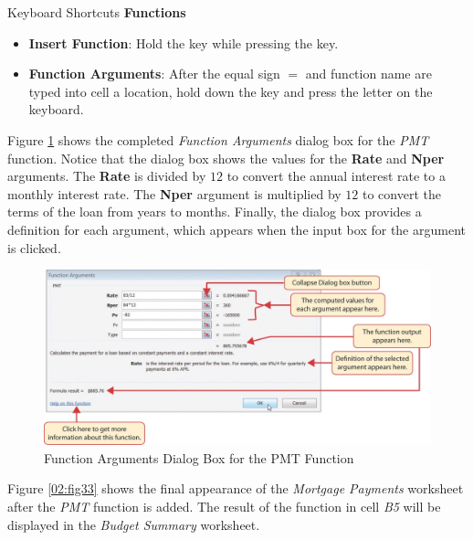 \begin{center}
	\begin{shtcutbox}{Keyboard Shortcuts}
		\textbf{Functions}
		\\
		\begin{itemize}
			\setlength{\itemsep}{0pt}
			\setlength{\parskip}{0pt}
			\setlength{\parsep}{0pt}
			
			\item \textbf{Insert Function}: Hold the  key while pressing the  key.
			\item \textbf{Function Arguments}: After the equal sign $ = $ and function name are typed into cell a location, hold down the  key and press the letter  on the keyboard.		
		\end{itemize}
	
	\end{shtcutbox}
\end{center}

Figure \ref{02:fig32} shows the completed \textit{Function Arguments} dialog box for the \textit{PMT} function. Notice that the dialog box shows the values for the \textbf{Rate} and \textbf{Nper} arguments. The \textbf{Rate} is divided by $ 12 $ to convert the annual interest rate to a monthly interest rate. The \textbf{Nper} argument is multiplied by $ 12 $ to convert the terms of the loan from years to months. Finally, the dialog box provides a definition for each argument, which appears when the input box for the argument is clicked.

\begin{figure}[H]
	\centering
	\includegraphics[width=\maxwidth{.95\linewidth}]{gfx/ch02_fig32}
	\caption{Function Arguments Dialog Box for the PMT Function}
	\label{02:fig32}
\end{figure}

Figure \ref{02:fig33} shows the final appearance of the \textit{Mortgage Payments} worksheet after the \textit{PMT} function is added. The result of the function in cell \textit{B5} will be displayed in the \textit{Budget Summary} worksheet.

